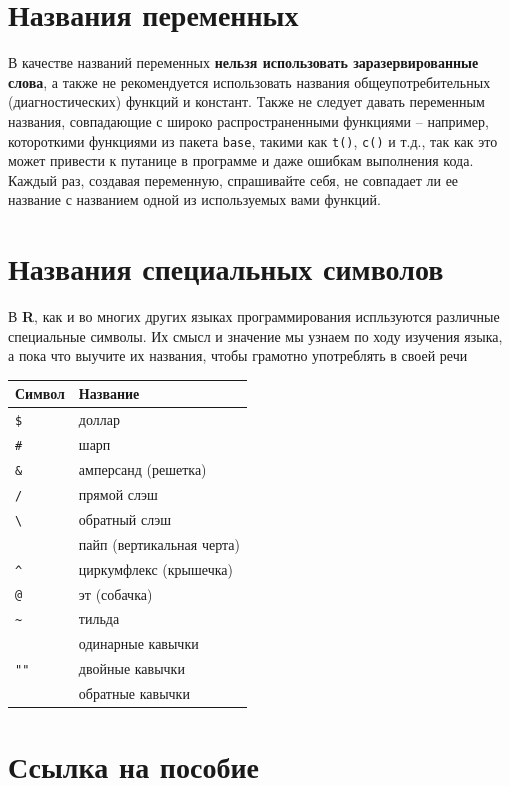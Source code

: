 \documentclass[]{book}
\begin{document}
\section*{Названия переменных}\label{-}

В качестве названий переменных \textbf{нельзя использовать
заразервированные слова}, а также не рекомендуется использовать названия
общеупотребительных (диагностических) функций и констант. Также не
следует давать переменным названия, совпадающие с широко
распространенными функциями -- например, котороткими функциями из пакета
\texttt{base}, такими как \texttt{t()}, \texttt{с()} и т.д., так как это
может привести к путанице в программе и даже ошибкам выполнения кода.
Каждый раз, создавая переменную, спрашивайте себя, не совпадает ли ее
название с названием одной из используемых вами функций.

\section*{Названия специальных символов}\label{--}

В \textbf{R}, как и во многих других языках программирования испльзуются
различные специальные символы. Их смысл и значение мы узнаем по ходу
изучения языка, а пока что выучите их названия, чтобы грамотно
употреблять в своей речи

\begin{longtable}[]{@{}ll@{}}
\toprule
Символ & Название\tabularnewline
\midrule
\endhead
\texttt{\$} & доллар\tabularnewline
\texttt{\#} & шарп\tabularnewline
\texttt{\&} & амперсанд (решетка)\tabularnewline
\texttt{/} & прямой слэш\tabularnewline
\texttt{\textbackslash{}} & обратный слэш\tabularnewline
\texttt{\textbar{}} & пайп (вертикальная черта)\tabularnewline
\texttt{\^{}} & циркумфлекс (крышечка)\tabularnewline
\texttt{@} & эт (собачка)\tabularnewline
\texttt{\textasciitilde{}} & тильда\tabularnewline
\texttt{\textquotesingle{}\textquotesingle{}} & одинарные
кавычки\tabularnewline
\texttt{""} & двойные кавычки\tabularnewline
\texttt{\textasciigrave{}\textasciigrave{}} & обратные
кавычки\tabularnewline
\bottomrule
\end{longtable}

\section*{Ссылка на пособие}\label{--}
\end{document}
